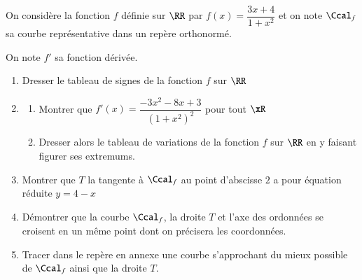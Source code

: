 \documentclass[oneside,12pt]{article}
\begin{document}
On considère la fonction $f$ définie sur $\RR$ par $f(x)=\dfrac{3x+4}{1+x^2}$ et on note $\Ccal_f$ sa courbe représentative dans un repère orthonormé.

On note $f'$ sa fonction dérivée.
\begin{enumerate}
	\item Dresser le tableau de signes de la fonction $f$ sur $\RR$
	\item \begin{enumerate}
		\item Montrer que $f'(x)=\dfrac{-3x^2-8x+3}{{(1+x^2)}^2}$ \quad pour tout $\xR$
		\item Dresser alors le tableau de variations de la fonction $f$ sur $\RR$ en y faisant figurer ses extremums.
	\end{enumerate}
	\item Montrer que $T$ la tangente à $\Ccal_f$ au point d'abscisse $2$ a pour équation réduite $y=4-x$
	\item Démontrer que la courbe $\Ccal_f$, la droite $T$ et l'axe des ordonnées se croisent en un même point dont on précisera les coordonnées.
	\item Tracer dans le repère en annexe une courbe s'approchant du mieux possible de $\Ccal_f$ ainsi que la droite $T$.
\end{enumerate}

\vspace{1cm}
\begin{center}
\end{center}
\end{document}

